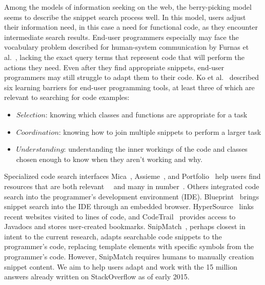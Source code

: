 Among the models of information seeking on the web, the berry-picking model~\cite{Bates-Design} seems to describe the snippet search process well.
In this model, users adjust their information need, in this case a need for functional code, as they encounter intermediate search results.
End-user programmers especially may face the vocabulary problem described for human-system communication by Furnas et al.~\cite{Furnas-Vocabulary}, lacking the exact query terms that represent code that will perform the actions they need.
Even after they find appropriate snippets, end-user programmers may still struggle to adapt them to their code.
Ko et al.~\cite{Ko-Six} described six learning barriers for end-user programming tools, at least three of which are relevant to searching for code examples:
\begin{itemize}
\item $Selection$: knowing which classes and functions are appropriate for a task
\item $Coordination$: knowing how to join multiple snippets to perform a larger task
\item $Understanding$: understanding the inner workings of the code and classes chosen enough to know when they aren't working and why.
\end{itemize}

Specialized code search interfaces Mica~\cite{Stylos-Mica}, Assieme~\cite{Hoffman-Assieme}, and Portfolio~\cite{McMillan-Portfolio} help users find resources that are both relevant~\cite{Stylos-Mica}~\cite{Hoffman-Assieme} and many in number~\cite{McMillan-Portfolio}.
Others integrated code search into the programmer's development environment (IDE).
Blueprint~\cite{Brandt-Example} brings snippet search into the IDE through an embedded browser.
HyperSource~\cite{Hartmann-HyperSource} links recent websites visited to lines of code, and CodeTrail~\cite{Goldman-CodeTrail} provides access to Javadocs and stores user-created bookmarks.
SnipMatch~\cite{Wightman-SnipMatch}, perhaps closest in intent to the current research, adapts searchable code snippets to the programmer's code, replacing template elements with specific symbols from the programmer's code.
However, SnipMatch requires humans to manually creation snippet content.
We aim to help users adapt and work with the 15 million answers already written on StackOverflow as of early 2015.
